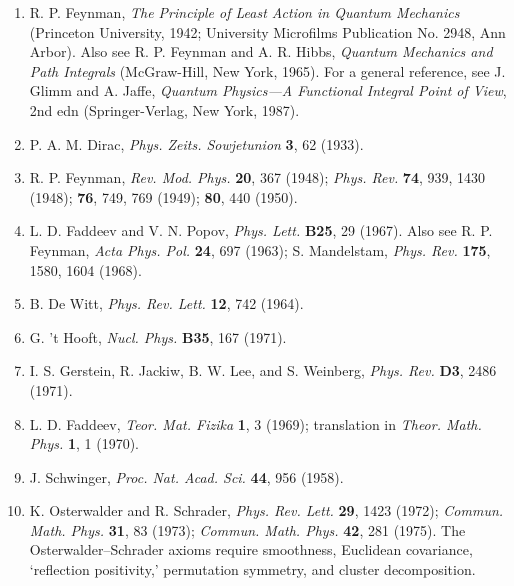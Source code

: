 \begin{enumerate}
\item\label{ref:9.1} R. P. Feynman, \emph{The Principle of Least Action in Quantum Mechanics}
  (Princeton University, 1942; University Microfilms Publication No. 2948,
  Ann Arbor). Also see R. P. Feynman and A. R. Hibbs, \emph{Quantum Mechanics
  and Path Integrals} (McGraw-Hill, New York, 1965). For a general reference,
  see J. Glimm and A. Jaffe, \emph{Quantum Physics---A Functional Integral
  Point of View}, 2nd edn (Springer-Verlag, New York, 1987).

\item\label{ref:9.2} P. A. M. Dirac, \emph{Phys. Zeits. Sowjetunion} \textbf{3}, 62 (1933).

\item\label{ref:9.3} R. P. Feynman, \emph{Rev. Mod. Phys.} \textbf{20}, 367 (1948);
  \emph{Phys. Rev.} \textbf{74}, 939, 1430 (1948); \textbf{76}, 749, 769
  (1949); \textbf{80}, 440 (1950).

\item\label{ref:9.4} L. D. Faddeev and V. N. Popov, \emph{Phys. Lett.} \textbf{B25}, 29
  (1967). Also see R. P. Feynman, \emph{Acta Phys. Pol.} \textbf{24}, 697
  (1963); S. Mandelstam, \emph{Phys. Rev.} \textbf{175}, 1580, 1604 (1968).

\item\label{ref:9.5} B. De Witt, \emph{Phys. Rev. Lett.} \textbf{12}, 742 (1964).

\item\label{ref:9.6} G. 't Hooft, \emph{Nucl. Phys.} \textbf{B35}, 167 (1971).

\item\label{ref:9.7} I. S. Gerstein, R. Jackiw, B. W. Lee, and S. Weinberg,
  \emph{Phys. Rev.} \textbf{D3}, 2486 (1971).

\item\label{ref:9.8} L. D. Faddeev, \emph{Teor. Mat. Fizika} \textbf{1}, 3 (1969);
  translation in \emph{Theor. Math. Phys.} \textbf{1}, 1 (1970).

\item[8a.]\label{ref:9.8a} J. Schwinger, \emph{Proc. Nat. Acad. Sci.} \textbf{44}, 956
  (1958).

\item[8b.]\label{ref:9.8b} K. Osterwalder and R. Schrader, \emph{Phys. Rev. Lett.}
  \textbf{29}, 1423 (1972); \emph{Commun. Math. Phys.} \textbf{31}, 83
  (1973); \emph{Commun. Math. Phys.} \textbf{42}, 281 (1975). The
  Osterwalder--Schrader axioms require smoothness, Euclidean covariance,
  `reflection positivity,' permutation symmetry, and cluster decomposition.


\end{enumerate}
